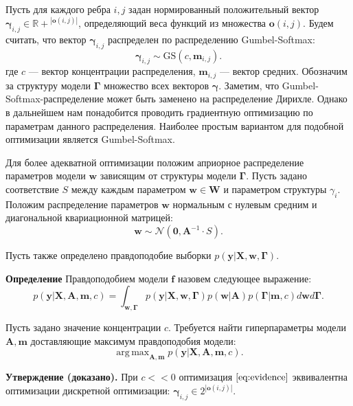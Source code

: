 \documentclass[12pt]{article}
\DeclareMathOperator*{\argmax}{arg\,max}
\begin{document}
Пусть для каждого ребра $i,j$ задан нормированный положительный вектор $\boldsymbol{\gamma}_{i,j} \in \mathbb{R+}^{|\mathbf{o}(i,j)|}$, определяющий веса функций из множества $\mathbf{o}(i,j)$.
Будем считать, что вектор $\boldsymbol{\gamma}_{i,j}$ распределен по распределению Gumbel-Softmax:
\[
    \boldsymbol{\gamma}_{i,j}  \sim \text{GS}({c}, \mathbf{m}_{i,j}).
\] 
где $c$ --- вектор концентрации распределения, $\mathbf{m}_{i,j}$ --- вектор средних. Обозначим за структуру модели $\boldsymbol{\Gamma}$ множество всех векторов $\boldsymbol{\gamma}$.
Заметим, что Gumbel-Softmax-распределение может быть заменено на распределение Дирихле. Однако в дальнейшем нам понадобится проводить градиентную оптимизацию по параметрам данного распределения. Наиболее простым вариантом для подобной оптимизации является Gumbel-Softmax.

Для более адекватной оптимизации положим априорное распределение параметров модели $\mathbf{w}$ зависящим от структуры модели $\boldsymbol{\Gamma}$.  Пусть задано соответствие $S$ между каждым параметром $\mathbf{w} \in \mathbf{W}$ и параметром структуры $\gamma_i$.
Положим распределение параметров $\mathbf{w}$ нормальным с нулевым средним и диагональной квариационной матрицей:
\[
    \mathbf{w} \sim \mathcal{N}(\mathbf{0}, \mathbf{A}^{-1} \cdot S).
\]


Пусть также определено правдоподобие выборки $p(\mathbf{y}|\mathbf{X}, \mathbf{w}, \boldsymbol{\Gamma}).$

\textbf{Определение} Правдоподобием модели $\mathbf{f}$ назовем следующее выражение: 
\begin{equation}
\label{eq:evidence}
	p(\mathbf{y}|\mathbf{X},\mathbf{A},\mathbf{m}, c) = \int_{\mathbf{w}, \boldsymbol{\Gamma} } p(\mathbf{y}|\mathbf{X},\mathbf{w},  \boldsymbol{\Gamma})p(\mathbf{w}|\mathbf{A})p(\boldsymbol{\Gamma}|\mathbf{m}, c)d\mathbf{w}d\mathbf{\Gamma}.
\end{equation}

Пусть задано значение концентрации $c$. 
Требуется найти гиперпараметры модели $\mathbf{A}, \mathbf{m}$ доставляющие максимум правдоподобия модели:
\[
    \argmax_{\mathbf{A}, \mathbf{m}}  p(\mathbf{y}|\mathbf{X},\mathbf{A},\mathbf{m}, c).
\]

\textbf{Утверждение (доказано).} При $c << 0$ оптимизация  $\eqref{eq:evidence}$ эквивалентна оптимизации дискретной оптимизации: $\boldsymbol{\gamma}_{i,j} \in 2^{|\mathbf{o}(i,j)|}$.
\end{document}
